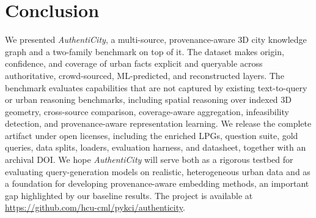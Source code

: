 \documentclass[sigconf,authordraft]{acmart}
\newcommand{\pinaforecomment}[4]{%
    \ifbool{showcomments}{%
        \colorbox{#1}{\textcolor{#4}{\parbox{.8\linewidth}{#2: #3}}}%
    }{}%
}
\newcommand{\lukascomment}[1]{\pinaforecomment{blue}{Lukas}{#1}{white}}
\newcommand{\benchname}{\textit{Authenti\-City}}
\begin{document}


\section{Conclusion}\label{sec:conclusion}

We presented \benchname{}, a multi-source, provenance-aware 3D city knowledge graph and a two-family benchmark on top of it. The dataset makes origin, confidence, and coverage of urban facts explicit and queryable across authoritative, crowd-sourced, ML-predicted, and reconstructed layers. The benchmark evaluates capabilities that are not captured by existing text-to-query or urban reasoning benchmarks, including spatial reasoning over indexed 3D geometry, cross-source comparison, coverage-aware aggregation, infeasibility detection, and provenance-aware representation learning. We release the complete artifact under open licenses, including the enriched LPGs, question suite, gold queries, data splits, loaders, evaluation harness, and datasheet, together with an archival DOI. We hope \benchname{} will serve both as a rigorous testbed for evaluating query-generation models on realistic, heterogeneous urban data and as a foundation for developing provenance-aware embedding methods, an important gap highlighted by our baseline results. 
The project is available at \url{https://github.com/hcu-cml/pykci/authenticity}.
\end{document}
